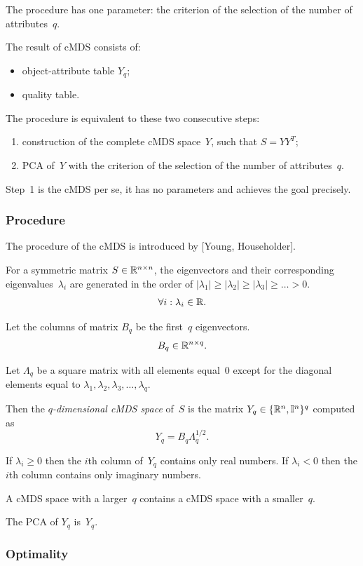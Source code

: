 \documentclass[10pt,a4paper]{article}
\begin{document}
The procedure has one parameter: the criterion of the selection of the number of attributes~$q$.

The result of cMDS consists of:
\begin{itemize}
    \item object-attribute table $Y_q$;
    \item quality table.
\end{itemize}

The procedure is equivalent to these two consecutive steps:
\begin{enumerate}
    \item construction of the complete cMDS space~$Y$, such that $S = YY^T$;
    \item PCA of~$Y$ with the criterion of the selection of the number of attributes~$q$.
\end{enumerate}

Step~1 is the cMDS per se, it has no parameters and achieves the goal precisely.


\subsubsection {Procedure}

The procedure of the cMDS is introduced by [Young, Householder].

For a symmetric matrix $S \in \mathbb R^{n \times n}$,
the eigenvectors and their corresponding eigenvalues~$\lambda_i$
are generated in the order of $|\lambda_1| \ge |\lambda_2| \ge |\lambda_3| \ge \dots > 0$.
$$ \forall i: \lambda_i \in \mathbb R.$$

Let the columns of matrix $B_q$ be the first~$q$ eigenvectors.
$$ B_q \in \mathbb R^{n \times q}.$$

Let $\Lambda_q$ be a square matrix with all elements equal~0
except for the diagonal elements equal to $\lambda_1, \lambda_2, \lambda_3, \dots, \lambda_q$.

Then the {\em $q$-dimensional cMDS space} of~$S$ is the matrix $Y_q \in \{\mathbb R^n,\mathbb I^n\}^q$ computed as
$$ Y_q = B_q \Lambda_q^{1/2}. $$

If $\lambda_i \ge 0$ then the $i$th column of~$Y_q$ contains only real numbers.
If $\lambda_i < 0$ then the $i$th column contains only imaginary numbers.

A cMDS space with a larger~$q$ contains a cMDS space with a smaller~$q$.

The PCA of $Y_q$ is~$Y_q$.


\subsubsection{Optimality}
\end{document}
